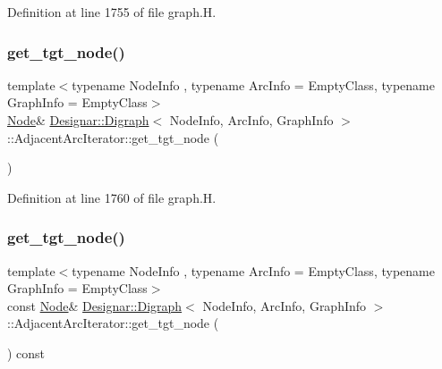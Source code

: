 Definition at line 1755 of file graph.\+H.

\mbox{\label{class_designar_1_1_digraph_1_1_adjacent_arc_iterator_ad1df4c6624e411ea5ec10ee3d1414b1c}} 
\subsubsection{\texorpdfstring{get\+\_\+tgt\+\_\+node()}{get\_tgt\_node()}\hspace{0.1cm}{\footnotesize\ttfamily [1/2]}}
{\footnotesize\ttfamily template$<$typename Node\+Info , typename Arc\+Info  = Empty\+Class, typename Graph\+Info  = Empty\+Class$>$ \\
\hyperlink{class_designar_1_1_digraph_a4dc921c41a480b7946a04170e997d8ae}{Node}\& \hyperlink{class_designar_1_1_digraph}{Designar\+::\+Digraph}$<$ Node\+Info, Arc\+Info, Graph\+Info $>$\+::Adjacent\+Arc\+Iterator\+::get\+\_\+tgt\+\_\+node (\begin{DoxyParamCaption}{ }\end{DoxyParamCaption})\hspace{0.3cm}{\ttfamily [inline]}}



Definition at line 1760 of file graph.\+H.

\mbox{\label{class_designar_1_1_digraph_1_1_adjacent_arc_iterator_a3b5e320227b6456e9b0de9d505e0eae4}} 
\subsubsection{\texorpdfstring{get\+\_\+tgt\+\_\+node()}{get\_tgt\_node()}\hspace{0.1cm}{\footnotesize\ttfamily [2/2]}}
{\footnotesize\ttfamily template$<$typename Node\+Info , typename Arc\+Info  = Empty\+Class, typename Graph\+Info  = Empty\+Class$>$ \\
const \hyperlink{class_designar_1_1_digraph_a4dc921c41a480b7946a04170e997d8ae}{Node}\& \hyperlink{class_designar_1_1_digraph}{Designar\+::\+Digraph}$<$ Node\+Info, Arc\+Info, Graph\+Info $>$\+::Adjacent\+Arc\+Iterator\+::get\+\_\+tgt\+\_\+node (\begin{DoxyParamCaption}{ }\end{DoxyParamCaption}) const\hspace{0.3cm}{\ttfamily [inline]}}



